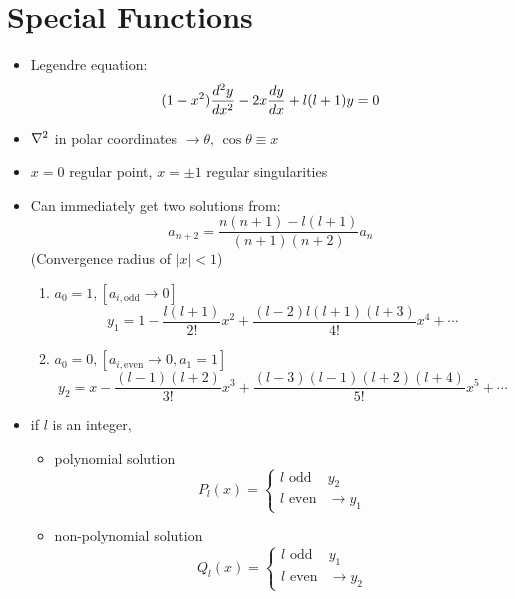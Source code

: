 \documentclass[Maths.tex]{subfiles}
\begin{document}
\section{Special Functions}
\begin{itemize}
    \item Legendre equation:
    \begin{equation}
        (1-x^2)\frac{d^2 y}{dx^2} - 2x\frac{dy}{dx} + l(l+1)y = 0
    \end{equation}
    \item $\nabla^2$ in polar coordinates $\to \theta,\, \cos\theta \equiv x$
    \item $x=0$ regular point, $x = \pm 1$ regular singularities
    \item Can immediately get two solutions from:
    \begin{equation}
        a_{n+2} = \frac{n(n+1) - l(l+1)}{(n+1)(n+2)}a_n
    \end{equation}
    (Convergence radius of $|x| < 1$)
    \begin{enumerate}
        \item $a_0 = 1, [a_{i,\text{odd}} \to 0]$
        \begin{equation}
            y_1 = 1 - \frac{l(l+1)}{2!}x^2 + \frac{(l-2)l(l+1)(l+3)}{4!}x^4 + \cdots
        \end{equation}
        \item $a_0 = 0, [a_{i,\text{even}} \to 0,a_1 = 1]$
        \begin{equation}
            y_2 = x - \frac{(l-1)(l+2)}{3!}x^3 + \frac{(l-3)(l-1)(l+2)(l+4)}{5!}x^5 + \cdots
        \end{equation}
    \end{enumerate}
    \item if $l$ is an integer,
    \begin{itemize}
        \item polynomial solution
        \begin{equation}
            P_l(x) = \begin{cases} l\text{ odd} & y_2 \\ l\text{ even} & \to y_1 \end{cases}
        \end{equation}
        \item non-polynomial solution
        \begin{equation}
            Q_l(x) = \begin{cases} l\text{ odd} & y_1 \\ l\text{ even} & \to y_2 \end{cases}

\end{equation}
\end{itemize}
\end{itemize}
\end{document}
